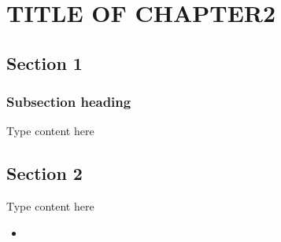 \chapter{TITLE OF CHAPTER2}
\graphicspath{{Chapter2/}}

\section{Section 1}
\subsection{Subsection heading}
Type content here
\section{Section 2}
Type content here
\begin{itemize}
	\item 
\end{itemize}
